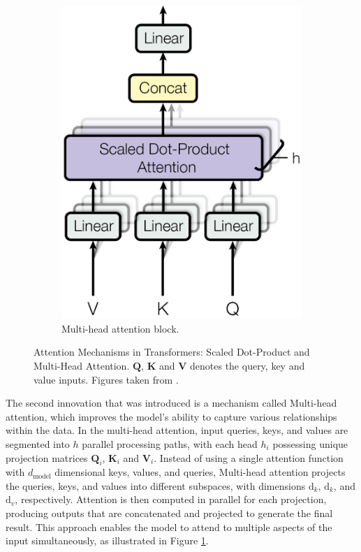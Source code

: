 \begin{figure}[h]
\begin{subfigure}[b]{0.45\textwidth}
        \includegraphics[width=0.92\linewidth]{obrazky-figures/multihead.png}
        \caption{Multi-head attention block.}
        \label{fig:subfig-b}
    \end{subfigure}
    \caption{Attention Mechanisms in Transformers: Scaled Dot-Product and Multi-Head Attention. $\textbf{Q}$, $\textbf{K}$ and $\textbf{V}$ denotes the query, key and value inputs. Figures taken from \cite{vaswani2017attention}.}
    \label{fig:main-figure}
\end{figure}


The second innovation that was introduced is a mechanism called Multi-head attention, which improves the model's ability to capture various relationships within the data. In the multi-head attention, input queries, keys, and values are segmented into $h$ parallel processing paths, with each head $h_i$ possessing unique projection matrices $\textbf{Q}_i$, $\textbf{K}_i$ and $\textbf{V}_i$. Instead of using a single attention function with $d_{\text{model}}$ dimensional keys, values, and queries, Multi-head attention projects the queries, keys, and values into different subspaces, with dimensions $\text{d}_k$, $\text{d}_k$, and $\text{d}_v$, respectively. Attention is then computed in parallel for each projection, producing outputs that are concatenated and projected to generate the final result. This approach enables the model to attend to multiple aspects of the input simultaneously, as illustrated in Figure \ref{fig:subfig-b}.

